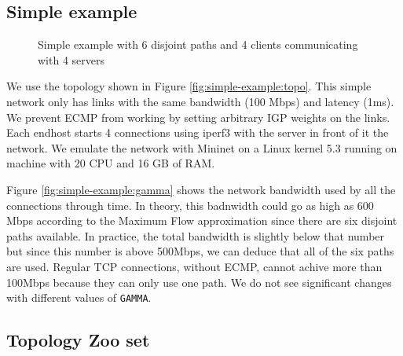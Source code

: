 
\subsection{Simple example}

\begin{figure}
	\centering
	\caption{Simple example with 6 disjoint paths and 4 clients communicating with 4 servers}
	\label{fig:simple-example}
\end{figure}

We use the topology shown in Figure \ref{fig:simple-example:topo}.
This simple network only has links with the same bandwidth (100 Mbps) and latency (1ms).
We prevent ECMP from working by setting arbitrary IGP weights on the links.
Each endhost starts 4 connections using iperf3 with the server in front of it the network.
We emulate the network with Mininet on a Linux kernel 5.3
running on machine with 20 CPU and 16 GB of RAM.

Figure \ref{fig:simple-example:gamma} shows the network bandwidth used by all the connections through time.
In theory, this badnwidth could go as high as 600 Mbps according to the Maximum Flow
approximation since there are six disjoint paths available.
In practice, the total bandwidth is slightly below that number but since this number is above 500Mbps,
we can deduce that all of the six paths are used.
Regular TCP connections, without ECMP, cannot achive more than 100Mbps because they can only use one path.
We do not see significant changes with different values of \texttt{GAMMA}.

\subsection{Topology Zoo set}

